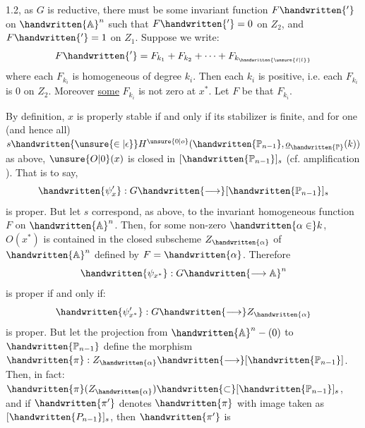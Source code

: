 1.2, as $G$ is reductive, there must be some invariant function $F\handwritten{'}$ on $\handwritten{\mathbb{A}}^n$ such that $F\handwritten{'}=0$ on $Z_2$, and $F\handwritten{'}=1$ on $Z_1$. Suppose we write:
\[
F\handwritten{'}=F_{k_1}+F_{k_2}+\cdots+F_{k_{\handwritten{\unsure{\ell|l}}}}
\]
where each $F_{k_i}$ is homogeneous of degree $k_i$. Then each $k_i$ is positive, i.e. each $F_{k_i}$ is $0$ on $Z_2$. Moreover \uline{some} $F_{k_i}$ is not zero at $x^*$. Let $F$ be that $F_{k_i}$.

By definition, $x$ is properly stable if and only if its stabilizer is finite, and for one (and hence all) $s\handwritten{\unsure{\in|\epsilon}}H^{\unsure{0|o}}(\handwritten{\mathbb{P}_{n-1}},\underline{o}_{\handwritten{\mathbb{P}}}(k))$ as above, $\unsure{O|0}(x)$ is closed in $[\handwritten{\mathbb{P}_{n-1}}]_s$ (cf. amplification ). That is to say,
\[
\handwritten{\psi'_x}:G\handwritten{\longrightarrow}[\handwritten{\mathbb{P}_{n-1}}]_s
\]
is proper. But let $s$ correspond, as above, to the invariant homogeneous function $F$ on $\handwritten{\mathbb{A}}^n$. Then, for some non-zero $\handwritten{\alpha\in}k$, $O(x^*)$ is contained in the closed subscheme $Z_{\handwritten{\alpha}}$ of $\handwritten{\mathbb{A}}^n$ defined by $F=\handwritten{\alpha}$. Therefore
\[
\handwritten{\psi_{x^*}}:G\handwritten{\longrightarrow\mathbb{A}}^n
\]
is proper if and only if:
\[
\handwritten{\psi'_{x^*}}:G\handwritten{\longrightarrow}Z_{\handwritten{\alpha}}
\]
is proper. But let the projection from $\handwritten{\mathbb{A}}^n-(0)$ to $\handwritten{\mathbb{P}_{n-1}}$ define the morphism $\handwritten{\pi}:Z_{\handwritten{\alpha}}\handwritten{\longrightarrow}[\handwritten{\mathbb{P}_{n-1}}]$. Then, in fact: $\handwritten{\pi}(Z_{\handwritten{\alpha}})\handwritten{\subset}[\handwritten{\mathbb{P}_{n-1}}]_s$, and if $\handwritten{\pi'}$ denotes $\handwritten{\pi}$ with image taken as $[\handwritten{P_{n-1}}]_s$, then $\handwritten{\pi'}$ is
